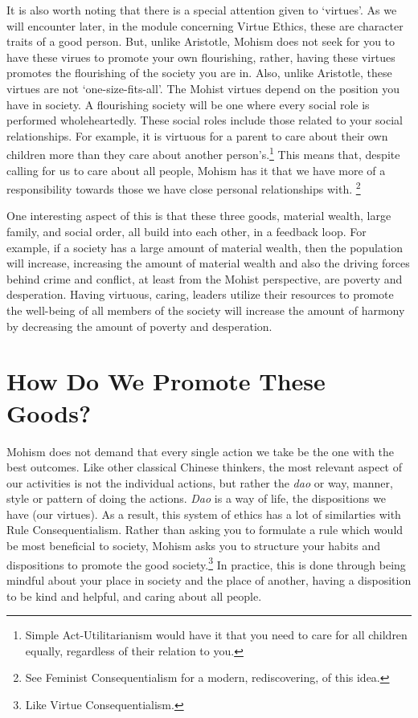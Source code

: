 It is also worth noting that there is a special attention given to `virtues'. As we will encounter later, in the module concerning Virtue Ethics, these are character traits of a good person. But, unlike Aristotle, Mohism does not seek for you to have these virues to promote your own flourishing, rather, having these virtues promotes the flourishing of the society you are in. Also, unlike Aristotle, these virtues are not `one-size-fits-all'. The Mohist virtues depend on the position you have in society. A flourishing society will be one where every social role is performed wholeheartedly. These social roles include those related to your social relationships. For example, it is virtuous for a parent to care about their own children more than they care about another person's.\footnote{Simple Act-Utilitarianism would have it that you need to care for all children equally, regardless of their relation to you.} This means that, despite calling for us to care about all people, Mohism has it that we have more of a responsibility towards those we have close personal relationships with.\autocite{Robins1} \footnote{See Feminist Consequentialism for a modern, rediscovering, of this idea.}  

One interesting aspect of this is that these three goods, material wealth, large family, and social order, all build into each other, in a feedback loop. For example, if a society has a large amount of material wealth, then the population will increase, increasing the amount of material wealth and also the driving forces behind crime and conflict, at least from the Mohist perspective, are poverty and desperation. Having virtuous, caring, leaders utilize their resources to promote the well-being of all members of the society will increase the amount of harmony by decreasing the amount of poverty and desperation. 

\section{How Do We Promote These Goods?}

Mohism does not demand that every single action we take be the one with the best outcomes. Like other classical Chinese thinkers, the most relevant aspect of our activities is not the individual actions, but rather the \emph{dao} or way, manner, style or pattern of doing the actions. \emph{Dao} is a way of life, the dispositions we have (our virtues). As a result, this system of ethics has a lot of similarties with Rule Consequentialism. Rather than asking you to formulate a rule which would be most beneficial to society, Mohism asks you to structure your habits and dispositions to promote the good society.\footnote{Like Virtue Consequentialism.} In practice, this is done through being mindful about your place in society and the place of another, having a disposition to be kind and helpful, and caring about all people. 


